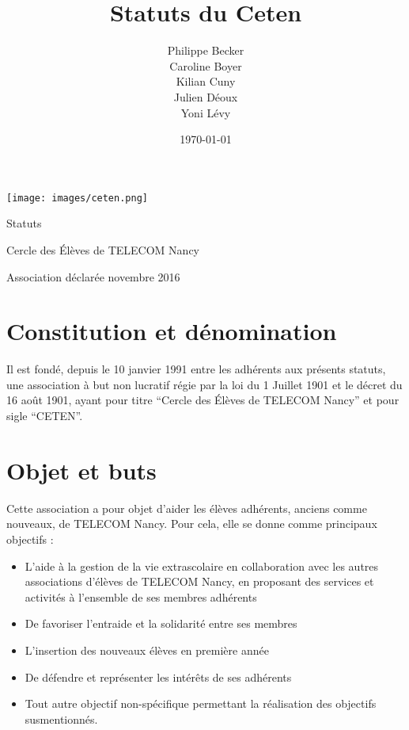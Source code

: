 \documentclass{article}
\title{Statuts du Ceten}
\author{Philippe Becker\\
	Caroline Boyer\\
	Kilian Cuny\\
	Julien Déoux\\
	Yoni Lévy} %
\date\today
\begin{document}

	
	\begin{titlepage}
		\begin{center}
			\texttt{[image: images/ceten.png]}\par
			\vspace{3cm}
			{\Huge \light Statuts}\par
			\vfill
			{\large Cercle des Élèves de TELECOM Nancy}\par
			{\large \light Association déclarée}
			\vfill
			{ novembre 2016}\par
		\end{center}
	\end{titlepage}

	



	\section{Constitution et dénomination}
		Il est fondé, depuis le 10 janvier 1991 entre les adhérents aux présents
		statuts, une association à but non lucratif régie par la loi du 1
		Juillet 1901 et le décret du 16 août 1901, ayant pour titre “Cercle des
		Élèves de TELECOM Nancy” et pour sigle “CETEN”.

	\section{Objet et buts}
	\label{sec:objet}
		Cette association a pour objet d’aider les élèves adhérents, anciens
		comme nouveaux, de TELECOM Nancy. Pour cela, elle se donne comme
		principaux objectifs :
		\begin{itemize}
			\item L’aide à la gestion de la vie extrascolaire en collaboration
				avec les autres associations d'élèves de TELECOM Nancy, en
				proposant des services et activités à l’ensemble de ses membres
				adhérents
			\item De favoriser l’entraide et la solidarité entre ses membres
			\item L’insertion des nouveaux élèves en première année
			\item De défendre et représenter les intérêts de ses adhérents
			\item Tout autre objectif non-spécifique permettant la réalisation
				des objectifs susmentionnés.
		\end{itemize}
\end{document}
